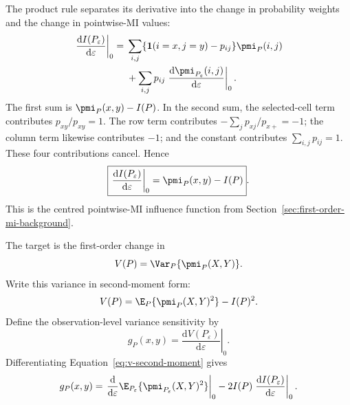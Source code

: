 The product rule separates its derivative into the change in probability
weights and the change in pointwise-MI values:
\begin{align}
  \left.\frac{\mathrm d I(P_\varepsilon)}{\mathrm d\varepsilon}
  \right|_{0}
  ={}&
  \sum_{i,j}
  \{\mathbf 1(i=x,j=y)-p_{ij}\}\pmi_P(i,j)
  \notag\\
  &+
  \sum_{i,j}p_{ij}
  \left.\frac{\mathrm d\pmi_{P_\varepsilon}(i,j)}
  {\mathrm d\varepsilon}\right|_{0}.
\end{align}
The first sum is \(\pmi_P(x,y)-I(P)\). In the second sum, the selected-cell
term contributes \(p_{xy}/p_{xy}=1\). The row term contributes
\(-\sum_j p_{xj}/p_{x+}=-1\); the column term likewise contributes \(-1\);
and the constant contributes \(\sum_{i,j}p_{ij}=1\). These four
contributions cancel. Hence
\begin{equation}
  \boxed{
  \left.\frac{\mathrm d I(P_\varepsilon)}{\mathrm d\varepsilon}
  \right|_{0}
  =\pmi_P(x,y)-I(P)
  }.
  \label{eq:mi-derivative}
\end{equation}
This is the centred pointwise-MI influence function from
Section~\ref{sec:first-order-mi-background}.

\medskip
{}

The target is the first-order change in
\begin{equation}
  V(P)
  =\Var_P\{\pmi_P(X,Y)\}.
\end{equation}
Write this variance in second-moment form:
\begin{equation}
  V(P)=\E_P\{\pmi_P(X,Y)^2\}-I(P)^2.
  \label{eq:v-second-moment}
\end{equation}
Define the observation-level variance sensitivity by
\begin{equation}
  g_P(x,y)
  =
  \left.
  \frac{\mathrm d V(P_\varepsilon)}{\mathrm d\varepsilon}
  \right|_{0}.
  \label{eq:g-definition}
\end{equation}
Differentiating Equation~\eqref{eq:v-second-moment} gives
\begin{equation}
  g_P(x,y)
  =
  \left.\frac{\mathrm d}{\mathrm d\varepsilon}
  \E_{P_\varepsilon}\{\pmi_{P_\varepsilon}(X,Y)^2\}
  \right|_{0}
  -2I(P)
  \left.\frac{\mathrm d I(P_\varepsilon)}{\mathrm d\varepsilon}
  \right|_{0}.
  \label{eq:g-decomposition}
\end{equation}

